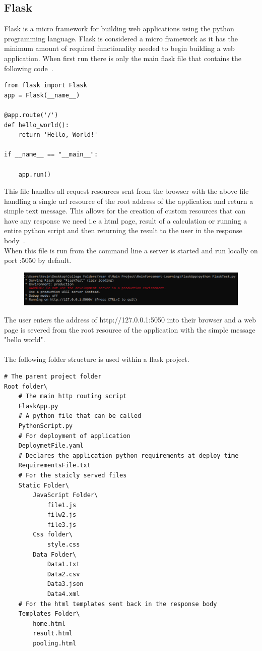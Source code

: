\subsection{Flask}
Flask is a micro framework for building  web applications using the python programming language. Flask is considered a micro framework as it has the minimum amount of required functionality needed to begin building a web application. When first run there is only the main flask file that contains the following code~\cite{Welcomet92:online}.
\begin{verbatim}
from flask import Flask
app = Flask(__name__)

@app.route('/')
def hello_world():
	return 'Hello, World!'

if __name__ == "__main__":

	app.run()
\end{verbatim}
This file handles all request resources sent from the browser with the above file handling a single url resource of the root address of the application and return a simple text message. This allows for the creation of custom resources that can have any response we need i.e a html page, result of a calculation or running a entire python script and then returning the result to the user in the response body~\cite{Welcomet92:online}.\\
When this file is run from the command line a server is started and run locally on port :5050 by default.
\begin{figure}[H]
	\centering
	\includegraphics[width=1\linewidth]{img/flaskCmd}
	\caption{}
	\label{fig:flaskcmd}
\end{figure}
The user enters the address of http://127.0.0.1:5050 into their browser and a web page is severed from the root resource of the application with the simple message "hello world".\\\\
The following folder structure is used within a flask project.
\begin{verbatim}
# The parent project folder
Root folder\
	# The main http routing script
	FlaskApp.py 
	# A python file that can be called
	PythonScript.py 
	# For deployment of application
	DeploymetFile.yaml
	# Declares the application python requirements at deploy time 
	RequirementsFile.txt 
	# For the staicly served files
	Static Folder\
		JavaScript Folder\
			file1.js
			filw2.js
			file3.js
		Css folder\
			style.css
		Data Folder\
			Data1.txt
			Data2.csv
			Data3.json
			Data4.xml
	# For the html templates sent back in the response body
	Templates Folder\
		home.html
		result.html
		pooling.html
\end{verbatim}

